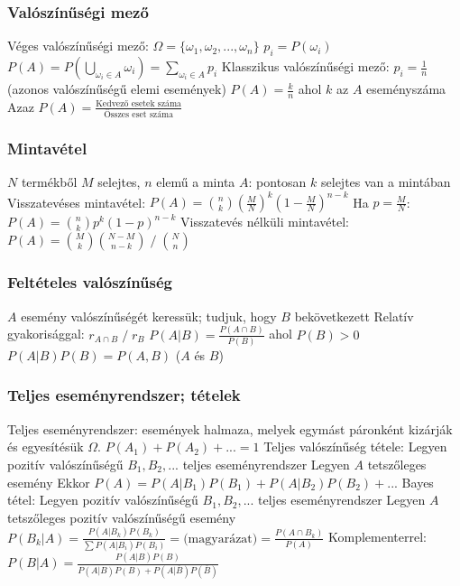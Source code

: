 \documentclass[12pt,a4paper]{article}
\begin{document}
\subsubsection{Valószínűségi mező}

\begin{outline}
	\1 Véges valószínűségi mező:
		\2 $\Omega = \{\omega_1, \omega_2, ..., \omega_n\}$
		\2 $p_i = P(\omega_i)$
		\2 $P(A) = P(\bigcup_{\omega_i \in A} \omega_i) = \sum_{\omega_i \in A} p_i$
	\1 Klasszikus valószínűségi mező:
		\2 $p_i = \frac{1}{n}$ (azonos valószínűségű elemi események)
		\2 $P(A) = \frac{k}{n}$ ahol $k$ az $A$ eseményszáma
		\2 Azaz $P(A) = \frac{\text{Kedvező esetek száma}}{\text{Összes eset száma}}$
\end{outline}

\subsubsection{Mintavétel}

\begin{outline}
	\1 $N$ termékből $M$ selejtes, $n$ elemű a minta
	\1 $A$: pontosan $k$ selejtes van a mintában
	\1 Visszatevéses mintavétel:
		\2 $P(A) = {n \choose k} (\frac{M}{N})^k (1 - \frac{M}{N})^{n-k}$
		\2 Ha $p=\frac{M}{N}$: $P(A) = {n \choose k} p^k (1 - p)^{n-k}$
	\1 Visszatevés nélküli mintavétel:
		\2 $P(A) = {M \choose k} {N - M \choose n - k} \; / \; {N \choose n}$
\end{outline}

\pagebreak

\subsubsection{Feltételes valószínűség}

\begin{outline}
	\1 $A$ esemény valószínűségét keressük; tudjuk, hogy $B$ bekövetkezett
	\1 Relatív gyakorisággal: $r_{A \cap B} \; / \; r_B$
	\1 $P(A|B) = \frac{P(A \cap B)}{P(B)}$ ahol $P(B) > 0$
	\1 $P(A|B)P(B) = P(A,B)$ \;\;($A$ és $B$)
\end{outline}

\subsubsection{Teljes eseményrendszer; tételek}

\begin{outline}
	\1 Teljes eseményrendszer: események halmaza, melyek egymást páronként kizárják és egyesítésük $\Omega$.
		\2 $P(A_1) + P(A_2) + ... = 1$
	\1 Teljes valószínűség tétele:
		\2 Legyen pozitív valószínűségű $B_1,B_2,...$ teljes eseményrendszer
		\2 Legyen $A$ tetszőleges esemény
		\2 Ekkor $P(A) = P(A|B_1)P(B_1) + P(A|B_2)P(B_2)+...$
	\1 Bayes tétel:
		\2 Legyen pozitív valószínűségű $B_1,B_2,...$ teljes eseményrendszer
		\2 Legyen $A$ tetszőleges pozitív valószínűségű esemény
		\2 $P(B_k|A) = \frac{P(A|B_k)P(B_k)}{\sum P(A|B_i)P(B_i)} = \text{(magyarázat)} = \frac{P(A \cap B_k)}{P(A)}$
		\2 Komplementerrel: $P(B|A) = \frac{P(A|B)P(B)}{P(A|B)P(B) + P(A|\overline{B})P(\overline{B})}$
\end{outline}
\end{document}

